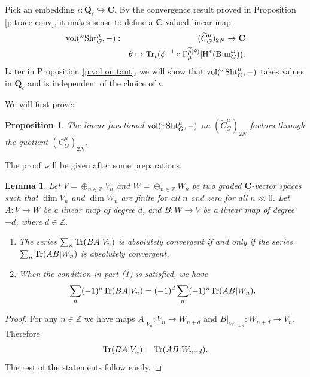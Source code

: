 \documentclass[reqno]{amsart}
\numberwithin{equation}{subsection}
\newtheorem{lemma}[subsubsection]{Lemma}
\newtheorem{prop}[subsubsection]{Proposition}
\theoremstyle{definition}
\def\CC{\mathbf{C}}
\def\ZZ{\mathbb{Z}}
\newcommand{\Bun}{\textup{Bun}}
\newcommand\Sht{\textup{Sht}}
\newcommand{\Tr}{\textup{Tr}}
\newcommand{\vol}{\textup{vol}}
\newcommand{\Qlbar}{\overline{\Q}_\ell}
\newcommand{\wt}[1]{\widetilde{#1}}
\newcommand\op{\oplus}
\renewcommand\c\circ
\newcommand{\cohog}[2]{\textup{H}^{#1}({#2})}     %
\newcommand\mt{\mapsto}
\newcommand{\incl}{\hookrightarrow}
\newcommand\G\Gamma
\newcommand{\io}{\iota}
\renewcommand{\th}{\theta}
\renewcommand\r\rho
\newcommand{\om}{\omega}
\newcommand{\Q}{\mathbf{Q}}
\begin{document}
\subsubsection{} Pick an embedding $\io: \Qlbar\incl \CC$. By the convergence result proved in Proposition \ref{p:trace conv}, it makes sense to define a $\CC$-valued linear map
\begin{eqnarray}\label{def vol on C}
    \vol({}^\omega \Sht_G^\mu, -)&:& (\wt C^\mu_G)_{2N}\to \CC\\
    &&\th \mt \Tr_\io(\phi^{-1}\c \G^{\wt\r(\th)}_\mu|\cohog{*}{\Bun_G^\om}).
\end{eqnarray}
Later in Proposition \ref{p:vol on taut}, we will show that $\vol({}^\omega \Sht_G^\mu, -)$ takes values in $\Qlbar$ and is independent of the choice of $\io$. 



We will first prove:
\begin{prop}\label{p:vol factor thru C}
    The linear functional $\vol({}^\omega \Sht_G^\mu, -)$ on $(\wt C^\mu_G)_{2N}$ factors through the quotient $(C^\mu_G)_{2N}$.
\end{prop}

The proof will be given after some preparations.

\begin{lemma}\label{l:trAB}
    Let $V=\op_{n\in \ZZ}V_n$ and $W=\op_{n\in \ZZ} W_n$ be two graded $\CC$-vector spaces such that $\dim V_n$ and $\dim W_n$ are finite for all $n$ and zero for all $n\ll0$. Let $A:V\to W$ be a linear map of degree $d$, and $B: W\to V$ be a linear map of degree $-d$, where $d\in \ZZ$. 
    \begin{enumerate}
        \item The series $\sum_{n} \Tr(BA|V_n)$ is absolutely convergent if and only if the series $\sum_{n} \Tr(AB|W_n)$ is absolutely convergent.
        \item When the condition in part (1) is satisfied, we have
        \begin{equation*}
            \sum_{n}(-1)^n\Tr(BA|V_n)=(-1)^d\sum_{n}(-1)^n\Tr(AB|W_n).
        \end{equation*}
    \end{enumerate}
\end{lemma}
\begin{proof}
    For any $n\in \ZZ$ we have maps $A|_{V_n}: V_n\to W_{n+d}$ and $B|_{W_{n+d}}: W_{n+d}\to V_n$. Therefore
    \begin{equation*}
        \Tr(BA|V_n)=\Tr(AB|W_{n+d}).
    \end{equation*}
    The rest of the statements follow easily.
\end{proof}
\end{document}

